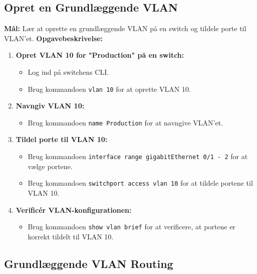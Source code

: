 \subsection{Opret en Grundlæggende VLAN}
\textbf{Mål:} Lær at oprette en grundlæggende VLAN på en switch og tildele porte til VLAN'et.
\newline\newline\noindent
\textbf{Opgavebeskrivelse:}
\begin{enumerate}
	\item \textbf{Opret VLAN 10 for "Production" på en switch:}
	\begin{itemize}
		\item Log ind på switchens CLI.
		\item Brug kommandoen \texttt{vlan 10} for at oprette VLAN 10.
	\end{itemize}
	\item \textbf{Navngiv VLAN 10:}
	\begin{itemize}
		\item Brug kommandoen \texttt{name Production} for at navngive VLAN'et.
	\end{itemize}
	\item \textbf{Tildel porte til VLAN 10:}
	\begin{itemize}
		\item Brug kommandoen \texttt{interface range gigabitEthernet 0/1 - 2} for at vælge portene.
		\item Brug kommandoen \texttt{switchport access vlan 10} for at tildele portene til VLAN 10.
	\end{itemize}
	\item \textbf{Verificér VLAN-konfigurationen:}
	\begin{itemize}
		\item Brug kommandoen \texttt{show vlan brief} for at verificere, at portene er korrekt tildelt til VLAN 10.
	\end{itemize}
\end{enumerate}

\subsection{Grundlæggende VLAN Routing}
